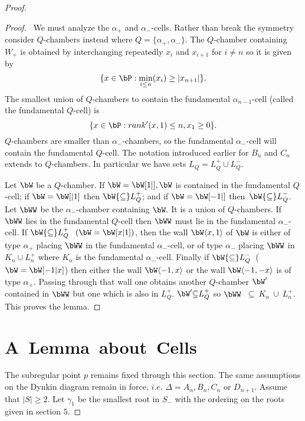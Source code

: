 \documentclass{memo-l}
\theoremstyle{definition}
\theoremstyle{remark}
\numberwithin{section}{chapter}
\numberwithin{equation}{chapter}
\begin{document}
\begin{proof}
\begin{proof} \  We must analyze the ${\alpha}_{+}$ and
${\alpha}_{-}$-cells.  Rather than break the symmetry consider $Q$-chambers
instead where $Q = \{{\alpha}_{+},{\alpha}_{-}\}$.  The $Q$-chamber
containing $W_{+}$ is obtained by interchanging repeatedly $x_{i}$ and
$x_{i+1}$ for $i \ne n$ so it is given by
$$
\{x  \in  \bP: \min_{i\le n}(x_i) \ge \vert x_{n+1}\vert\}.
$$
The smallest union of $Q$-chambers to contain the fundamental
${\alpha}_{n-1}$-cell (called the fundamental $Q$-cell) is
$$
\{x  \in  \bP: rank'(x,1) \le n, x_{1} \ge 0\}.
$$
$Q$-chambers are smaller than ${\alpha}_{-}$-chambers, so the fundamental
${\alpha}_{-}$-cell will contain the fundamental $Q$-cell.  The notation
introduced earlier for $B_{n}$ and $C_{n}$ extends to $Q$-chambers.  In
particular we have sets $L_{Q} = L_{Q}^{+} \cup L_{Q}^{-}$.
 
\medpagebreak

   Let ${\bW}$ be a $Q$-chamber.  If $\bW = \bW[1\vert ], 
\bW$ is contained in the fundamental $Q$-cell; if $\bW 
= \bW [\vert 1]$ then $\bW {\subseteq} L_{Q}^{+}$; and if 
$\bW = \bW [-1\vert ]$ then\ $\bW {\subseteq} L_{Q}^{-}$.  
Let $\bWW$ be the ${\alpha}_{-}$-chamber
containing $\bW.$ It is a union of $Q$-chambers.  If 
$\bWW$ lies in
the fundamental $Q$-cell then $\bWW$ must lie in the fundamental
${\alpha}_{-}$-cell.  If $\bW {\subseteq} L_{Q}^{+}$ $\ (\bW = 
\bW [x\vert 1])$, then the wall $\bW \langle x,1\rangle $ of ${\bW}$ 
is either of type ${\alpha}_{+}$ placing $\bWW$ 
in the fundamental ${\alpha}_{-}$-cell, or
of type ${\alpha}_{-}$ placing $\bWW$ in 
$K_{n} \cup L_{n}^{+}$ where $K_{n}$ is the fundamental
${\alpha}_{-}$-cell.  Finally if $\bW {\subseteq} L_{Q}^{-}$\ 
($\bW = \bW [-1\vert x]$) then either the wall 
$\bW \langle -1,x\rangle $ or the wall $\bW \langle -1,-x\rangle $ is of type ${\alpha}_{+}$.  
Passing through that wall one
obtains another $Q$-chamber $\bW'$ contained in 
$\bWW$ but one which
is also in $L_{Q}^{+}$.  $\bW' {\subseteq} L_{Q}^{+}$ so 
$\bWW$\ ${\subseteq}\ K_{n}\ \cup\ L_{n}^{+}$.  This
proves the lemma.
\end{proof} 

\section{A\ Lemma\ about\ Cells}
\medpagebreak

   The subregular point $p$ remains fixed through this section.  The same
assumptions on the Dynkin diagram remain in force, $i.e$.  ${\Delta} =
A_{n}, B_{n}, C_{n}$ or $D_{n+1}$.  Assume that $\vert S\vert \ge 2$.
Let ${\gamma}_{1}$ be the smallest root in $S_{-}$ with the ordering on the
roots given in section $5$.


\end{proof}
\end{document}
